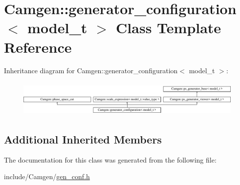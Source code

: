 \hypertarget{a00237}{\section{Camgen\-:\-:generator\-\_\-configuration$<$ model\-\_\-t $>$ Class Template Reference}
\label{a00237}
}
Inheritance diagram for Camgen\-:\-:generator\-\_\-configuration$<$ model\-\_\-t $>$\-:\begin{figure}[H]
\begin{center}
\leavevmode
\includegraphics[height=1.836066cm]{a00237}
\end{center}
\end{figure}
\subsection*{Additional Inherited Members}


The documentation for this class was generated from the following file\-:\begin{DoxyCompactItemize}
\item 
include/\-Camgen/\hyperlink{a00631}{gen\-\_\-conf.\-h}\end{DoxyCompactItemize}
